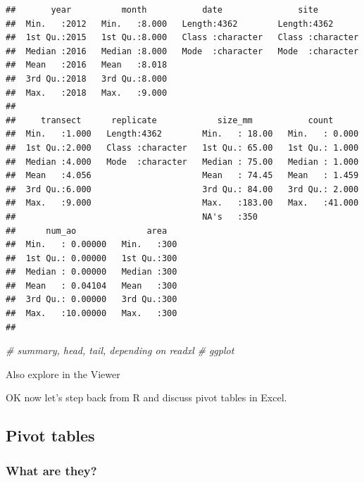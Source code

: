 \documentclass[]{book}
\newenvironment{Shaded}{\begin{snugshade}}{\end{snugshade}}
\newcommand{\CommentTok}[1]{\textcolor[rgb]{0.56,0.35,0.01}{\textit{#1}}}
\begin{document}
\begin{verbatim}
##       year          month           date               site          
##  Min.   :2012   Min.   :8.000   Length:4362        Length:4362       
##  1st Qu.:2015   1st Qu.:8.000   Class :character   Class :character  
##  Median :2016   Median :8.000   Mode  :character   Mode  :character  
##  Mean   :2016   Mean   :8.018                                        
##  3rd Qu.:2018   3rd Qu.:8.000                                        
##  Max.   :2018   Max.   :9.000                                        
##                                                                      
##     transect      replicate            size_mm           count       
##  Min.   :1.000   Length:4362        Min.   : 18.00   Min.   : 0.000  
##  1st Qu.:2.000   Class :character   1st Qu.: 65.00   1st Qu.: 1.000  
##  Median :4.000   Mode  :character   Median : 75.00   Median : 1.000  
##  Mean   :4.056                      Mean   : 74.45   Mean   : 1.459  
##  3rd Qu.:6.000                      3rd Qu.: 84.00   3rd Qu.: 2.000  
##  Max.   :9.000                      Max.   :183.00   Max.   :41.000  
##                                     NA's   :350                      
##      num_ao              area    
##  Min.   : 0.00000   Min.   :300  
##  1st Qu.: 0.00000   1st Qu.:300  
##  Median : 0.00000   Median :300  
##  Mean   : 0.04104   Mean   :300  
##  3rd Qu.: 0.00000   3rd Qu.:300  
##  Max.   :10.00000   Max.   :300  
## 
\end{verbatim}

\begin{Shaded}
\begin{Highlighting}[]
\CommentTok{# summary, head, tail, depending on readxl}
\CommentTok{# ggplot}
\end{Highlighting}
\end{Shaded}

Also explore in the Viewer

OK now let's step back from R and discuss pivot tables in Excel.

\hypertarget{pivot-tables}{%
\subsection{Pivot tables}\label{pivot-tables}}

\hypertarget{what-are-they}{%
\subsubsection{What are they?}\label{what-are-they}}
\end{document}
